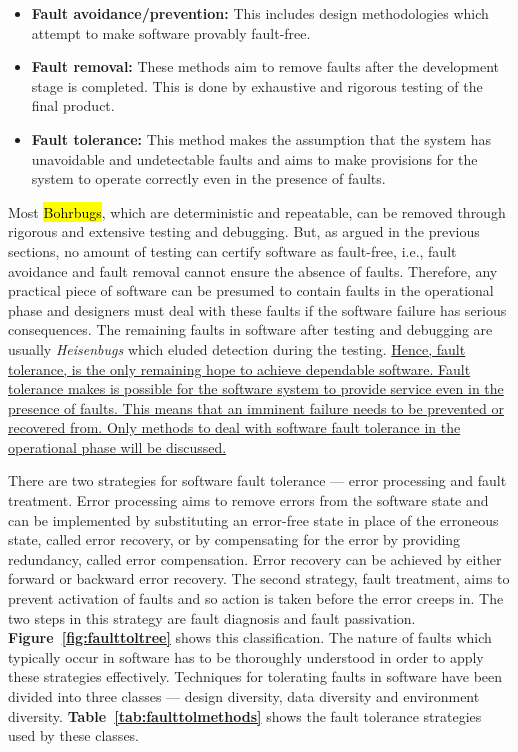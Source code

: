\documentclass[a4paper, 11pt]{article}
\begin{document}
\begin{itemize}
\item \textbf{Fault avoidance/prevention:} This includes design methodologies which attempt to make software provably fault-free.
\item \textbf{Fault removal:} These methods aim to remove faults after the development stage is completed. This is done by exhaustive and rigorous testing of the final product.
\item \textbf{Fault tolerance:} This method makes the assumption that the system has unavoidable and undetectable faults and aims to make provisions for the system to operate correctly even in the presence of faults.
\end{itemize}

Most \hl{Bohrbugs}, which are deterministic and repeatable, can be removed through rigorous and extensive testing and debugging. But, as argued in the previous sections, no amount of testing can certify software as fault-free, i.e., fault avoidance and fault removal cannot ensure the absence of faults. Therefore, any practical piece of software can be presumed to contain faults in the operational phase and designers must deal with these faults if the software failure has serious consequences. The remaining faults in software after testing and debugging are usually \emph{Heisenbugs} which eluded detection during the testing. \ul{Hence, fault tolerance, is the only remaining hope to achieve dependable software. Fault tolerance makes is possible for the software system to provide service even in the presence of faults. This means that an imminent failure needs to be prevented or recovered from. Only methods to deal with software fault tolerance in the operational phase will be discussed.}

There are two strategies for software fault tolerance --- error processing and fault treatment. Error processing aims to remove errors from the software state and can be implemented by substituting an error-free state in place of the erroneous state, called error recovery, or by compensating for the error by providing redundancy, called error compensation. Error recovery can be achieved by either forward or backward error recovery. The second strategy, fault treatment, aims to prevent activation of faults and so action is taken before the error creeps in. The two steps in this strategy are fault diagnosis and fault passivation. \textbf{Figure~\ref{fig:faulttoltree}} shows this classification. The nature of faults which typically occur in software has to be thoroughly understood in order to apply these strategies effectively. Techniques for tolerating faults in software have been divided into three classes --- design diversity, data diversity and environment diversity. \textbf{Table~\ref{tab:faulttolmethods}} shows the fault tolerance strategies used by these classes.
\end{document}
